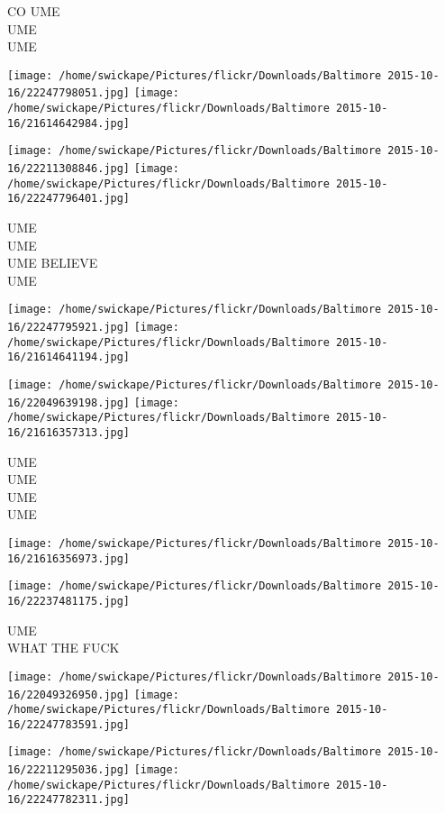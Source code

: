 \documentclass[10pt,letterpaper]{article}
\begin{document}
CO UME\\
UME\\
UME\\
\pagebreak

\texttt{[image: /home/swickape/Pictures/flickr/Downloads/Baltimore 2015-10-16/22247798051.jpg]}
\texttt{[image: /home/swickape/Pictures/flickr/Downloads/Baltimore 2015-10-16/21614642984.jpg]}

\texttt{[image: /home/swickape/Pictures/flickr/Downloads/Baltimore 2015-10-16/22211308846.jpg]}
\texttt{[image: /home/swickape/Pictures/flickr/Downloads/Baltimore 2015-10-16/22247796401.jpg]}

UME\\
UME\\
UME BELIEVE\\
UME\\
\pagebreak

\texttt{[image: /home/swickape/Pictures/flickr/Downloads/Baltimore 2015-10-16/22247795921.jpg]}
\texttt{[image: /home/swickape/Pictures/flickr/Downloads/Baltimore 2015-10-16/21614641194.jpg]}

\texttt{[image: /home/swickape/Pictures/flickr/Downloads/Baltimore 2015-10-16/22049639198.jpg]}
\texttt{[image: /home/swickape/Pictures/flickr/Downloads/Baltimore 2015-10-16/21616357313.jpg]}

UME\\
UME\\
UME\\
UME\\
\pagebreak

\texttt{[image: /home/swickape/Pictures/flickr/Downloads/Baltimore 2015-10-16/21616356973.jpg]}

\vspace{0.25in}
\texttt{[image: /home/swickape/Pictures/flickr/Downloads/Baltimore 2015-10-16/22237481175.jpg]}

UME\\
WHAT THE FUCK\\
\pagebreak

\texttt{[image: /home/swickape/Pictures/flickr/Downloads/Baltimore 2015-10-16/22049326950.jpg]}
\texttt{[image: /home/swickape/Pictures/flickr/Downloads/Baltimore 2015-10-16/22247783591.jpg]}

\texttt{[image: /home/swickape/Pictures/flickr/Downloads/Baltimore 2015-10-16/22211295036.jpg]}
\texttt{[image: /home/swickape/Pictures/flickr/Downloads/Baltimore 2015-10-16/22247782311.jpg]}
\end{document}
